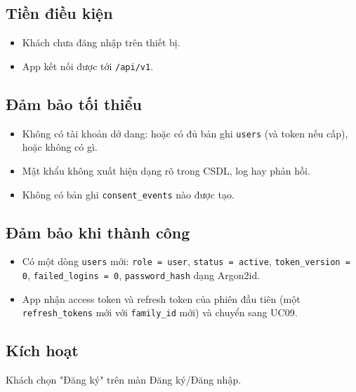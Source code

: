 \subsection{Tiền điều kiện}
\begin{itemize}
\item Khách chưa đăng nhập trên thiết bị.
\item App kết nối được tới {\small\texttt{/\allowbreak{}\allowbreak{}api/\allowbreak{}\allowbreak{}v1}}.
\end{itemize}
\subsection{Đảm bảo tối thiểu}
\begin{itemize}
\item Không có tài khoản dở dang: hoặc có đủ bản ghi {\small\texttt{users}} (và token nếu cấp), hoặc không có gì.
\item Mật khẩu không xuất hiện dạng rõ trong CSDL, log hay phản hồi.
\item Không có bản ghi {\small\texttt{consent\_\allowbreak{}\allowbreak{}events}} nào được tạo.
\end{itemize}
\subsection{Đảm bảo khi thành công}
\begin{itemize}
\item Có một dòng {\small\texttt{users}} mới: {\small\texttt{role = user}}, {\small\texttt{status = active}}, {\small\texttt{token\_\allowbreak{}\allowbreak{}version = 0}}, {\small\texttt{failed\_\allowbreak{}\allowbreak{}logins = 0}}, {\small\texttt{password\_\allowbreak{}\allowbreak{}hash}} dạng Argon2id.
\item App nhận access token và refresh token của phiên đầu tiên (một {\small\texttt{refresh\_\allowbreak{}\allowbreak{}tokens}} mới với {\small\texttt{family\_\allowbreak{}\allowbreak{}id}} mới) và chuyển sang UC09.
\end{itemize}
\subsection{Kích hoạt}
Khách chọn "Đăng ký" trên màn Đăng ký/\allowbreak{}Đăng nhập.

